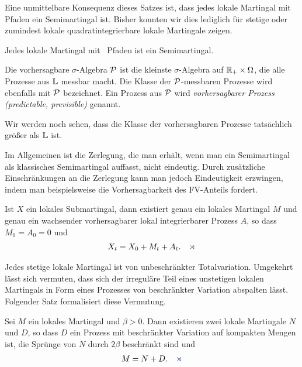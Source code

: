 Eine unmittelbare Konsequenz dieses Satzes ist, dass jedes lokale
Martingal mit \cadlag Pfaden ein Semimartingal ist. Bisher konnten wir dies
lediglich für stetige oder zumindest lokale
quadratintegrierbare lokale Martingale zeigen.

\begin{korollar}
\label{cor:3.1}
 Jedes lokale Martingal mit \cadlag\ Pfaden ist ein
  Semimartingal.
\end{korollar}

\begin{definition}
\label{defn:3.2}
Die vorhersagbare $\sigma$-Algebra $\mathcal{P}$ ist die kleinste
  $\sigma$-Algebra auf $\mathbb{R}_+\times \Omega$, die alle Prozesse aus $\mathbb{L}$
  messbar macht. Die Klasse der $\mathcal{P}$-messbaren Prozesse wird ebenfalls mit
  $\mathcal{P}$ bezeichnet. Ein Prozess aus $\mathcal{P}$ wird \emph{vorhersagbarer Prozess
  (predictable, previsible)} genannt.\fish
\end{definition}

Wir werden noch sehen, dass die Klasse der vorhersagbaren Prozesse
tatsächlich größer als $\mathbb{L}$ ist.

Im Allgemeinen ist die Zerlegung, die man erhält, wenn man ein Semimartingal als
klassisches Semimartingal auffasst, nicht eindeutig. Durch zusätzliche
Einschränkungen an die Zerlegung kann man jedoch Eindeutigkeit erzwingen, indem
man beispielsweise die Vorhersagbarkeit des FV-Anteils fordert.

\begin{theorem}
\label{doob-meyer}
\label{prop:3.2}
Ist $X$ ein lokales Submartingal, dann existiert genau ein lokales Martingal $M$
und genau ein wachsender vorhersagbarer lokal integrierbarer Prozess $A$, so
dass $M_0=A_0=0$ und
\begin{align*}
X_t=X_0+M_t+A_t.\fish
\end{align*}
\end{theorem}

Jedes stetige lokale Martingal ist von unbeschränkter Totalvariation. Umgekehrt
lässt sich vermuten, dass sich der irreguläre Teil eines unstetigen lokalen
Martingals in Form eines Prozesses von beschränkter Variation
abspalten lässt. Folgender Satz formalisiert diese Vermutung.

\begin{theorem}
\label{FundiLokMart} 
\label{prop:3.3}
Sei
  $M$ ein lokales Martingal und $\beta > 0$. Dann existieren zwei lokale
  Martingale $N$ und $D$, so dass $D$ ein Prozess mit beschränkter Variation
  auf kompakten Mengen ist, die Sprünge von $N$ durch $2\beta$ beschränkt sind
  und
\begin{align*}
M=N+D.\fish
\end{align*}
\end{theorem}

